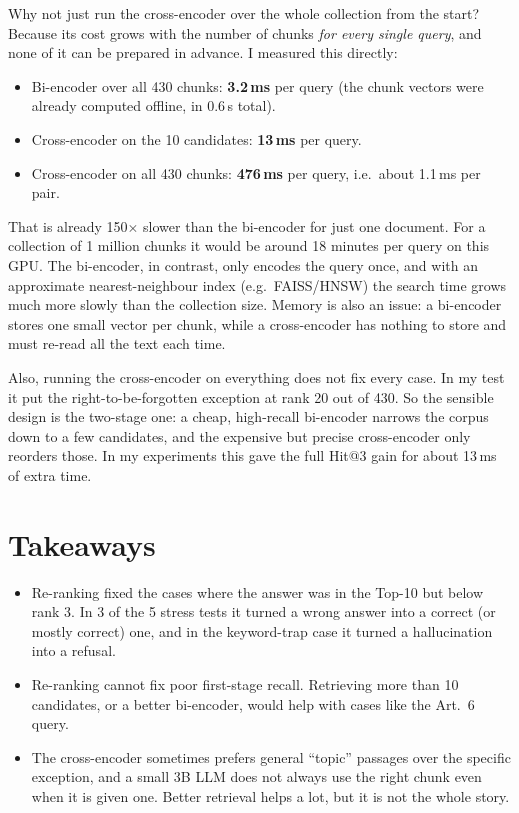 \documentclass[11pt]{article}
\begin{document}
Why not just run the cross-encoder over the whole collection from the start? Because its cost grows with the number of
chunks \emph{for every single query}, and none of it can be prepared in advance. I measured this directly:

\begin{itemize}
  \item Bi-encoder over all 430 chunks: \textbf{3.2\,ms} per query (the chunk vectors were already computed offline, in 0.6\,s total).
  \item Cross-encoder on the 10 candidates: \textbf{13\,ms} per query.
  \item Cross-encoder on all 430 chunks: \textbf{476\,ms} per query, i.e.\ about 1.1\,ms per pair.
\end{itemize}

That is already 150$\times$ slower than the bi-encoder for just one document. For a collection of 1 million chunks it
would be around 18 minutes per query on this GPU. The bi-encoder, in contrast, only encodes the query once, and with an
approximate nearest-neighbour index (e.g.\ FAISS/HNSW) the search time grows much more slowly than the collection size.
Memory is also an issue: a bi-encoder stores one small vector per chunk, while a cross-encoder has nothing to store and
must re-read all the text each time.

Also, running the cross-encoder on everything does not fix every case. In my test it put the right-to-be-forgotten
exception at rank 20 out of 430. So the sensible design is the two-stage one: a cheap, high-recall bi-encoder narrows
the corpus down to a few candidates, and the expensive but precise cross-encoder only reorders those. In my experiments
this gave the full Hit@3 gain for about 13\,ms of extra time.

\section{Takeaways}
\begin{itemize}
  \item Re-ranking fixed the cases where the answer was in the Top-10 but below rank 3. In 3 of the 5 stress tests it turned a
  wrong answer into a correct (or mostly correct) one, and in the keyword-trap case it turned a hallucination into a refusal.
  \item Re-ranking cannot fix poor first-stage recall. Retrieving more than 10 candidates, or a better bi-encoder, would
  help with cases like the Art.\ 6 query.
  \item The cross-encoder sometimes prefers general ``topic'' passages over the specific exception, and a small 3B LLM does not
  always use the right chunk even when it is given one. Better retrieval helps a lot, but it is not the whole story.
\end{itemize}
\end{document}
